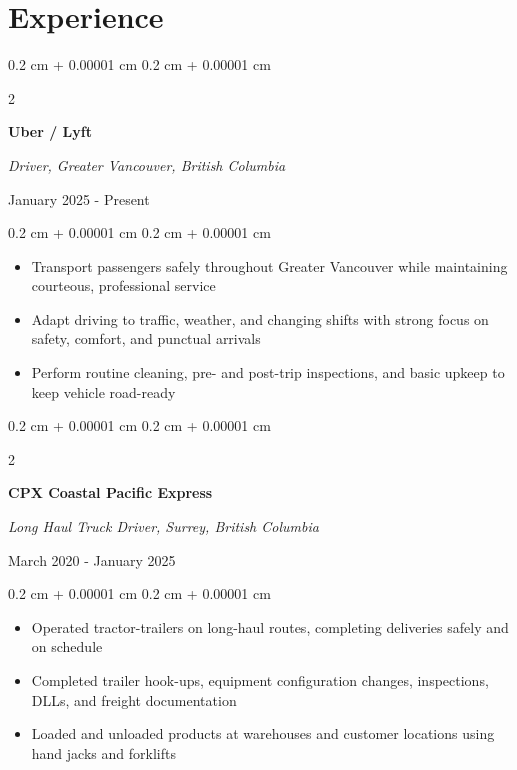 \documentclass[10pt, letterpaper]{article}
\newenvironment{highlights}{
    \begin{itemize}[
        topsep=0.10 cm,
        parsep=0.10 cm,
        partopsep=0pt,
        itemsep=0pt,
        leftmargin=0.4 cm + 10pt
    ]
}{
    \end{itemize}
}
\newenvironment{onecolentry}{
    \begin{adjustwidth}{
        0.2 cm + 0.00001 cm
    }{
        0.2 cm + 0.00001 cm
    }
}{
    \end{adjustwidth}
}
\newenvironment{twocolentry}[2][]{
    \begin{adjustwidth}{
        0.2 cm + 0.00001 cm
    }{
        0.2 cm + 0.00001 cm
    }
    \def\secondColumn{#2}
    \setcolumnwidth{\fill, 4.5 cm}
    \begin{paracol}{2}
}{
    \switchcolumn \raggedleft \secondColumn
    \end{paracol}
    \end{adjustwidth}
}
\begin{document}
    \section{Experience}
        \begin{twocolentry}{January 2025 - Present}
            \textbf{Uber / Lyft}

            \textit{Driver, Greater Vancouver, British Columbia}
        \end{twocolentry}

        \vspace{0.10 cm}
        \begin{onecolentry}
            \begin{highlights}
                \item Transport passengers safely throughout Greater Vancouver while maintaining courteous, professional service
                \item Adapt driving to traffic, weather, and changing shifts with strong focus on safety, comfort, and punctual arrivals
                \item Perform routine cleaning, pre- and post-trip inspections, and basic upkeep to keep vehicle road-ready
            \end{highlights}
        \end{onecolentry}

        \vspace{0.2 cm}

        \begin{twocolentry}{March 2020 - January 2025}
            \textbf{CPX Coastal Pacific Express}

            \textit{Long Haul Truck Driver, Surrey, British Columbia}
        \end{twocolentry}

        \vspace{0.10 cm}
        \begin{onecolentry}
            \begin{highlights}
                \item Operated tractor-trailers on long-haul routes, completing deliveries safely and on schedule
                \item Completed trailer hook-ups, equipment configuration changes, inspections, DLLs, and freight documentation
                \item Loaded and unloaded products at warehouses and customer locations using hand jacks and forklifts
            \end{highlights}
        \end{onecolentry}
\end{document}

